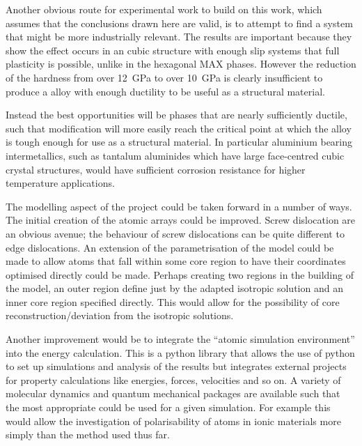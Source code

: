 Another obvious route for experimental work to build on this work, which assumes that the conclusions drawn here are valid, is to attempt to find a system that might be more industrially relevant. The  results are important because they show the effect occurs in an cubic structure with enough slip systems that full plasticity is possible, unlike in the hexagonal MAX phases. However the reduction of the hardness from over \SI{12}{\giga\pascal} to over \SI{10}{\giga\pascal} is clearly insufficient to produce a alloy with enough ductility to be useful as a structural material.

Instead the best opportunities will be phases that are nearly sufficiently ductile, such that modification will more easily reach the critical point at which the alloy is tough enough for use as a structural material. In particular aluminium bearing intermetallics, such as tantalum aluminides which have large face-centred cubic crystal structures, would have sufficient corrosion resistance for higher temperature applications.

The modelling aspect of the project could be taken forward in a number of ways. The initial creation of the atomic arrays could be improved. Screw dislocation are an obvious avenue; the behaviour of screw dislocations can be quite different to edge dislocations. An extension of the parametrisation of the model could be made to allow atoms that fall within some core region to have their coordinates optimised directly could be made. Perhaps creating two regions in the building of the model, an outer region define just by the adapted isotropic solution and an inner core region specified directly. This would allow for the possibility of core reconstruction/deviation from the isotropic solutions.

Another improvement would be to integrate the ``atomic simulation environment'' into the energy calculation. This is a python library that allows the use of python to set up simulations and analysis of the results but integrates external projects for property calculations like energies, forces, velocities and so on. A variety of molecular dynamics and quantum mechanical packages are available such that the most appropriate could be used for a given simulation. For example this would allow the investigation of polarisability of atoms in ionic materials more simply than the method used thus far.

